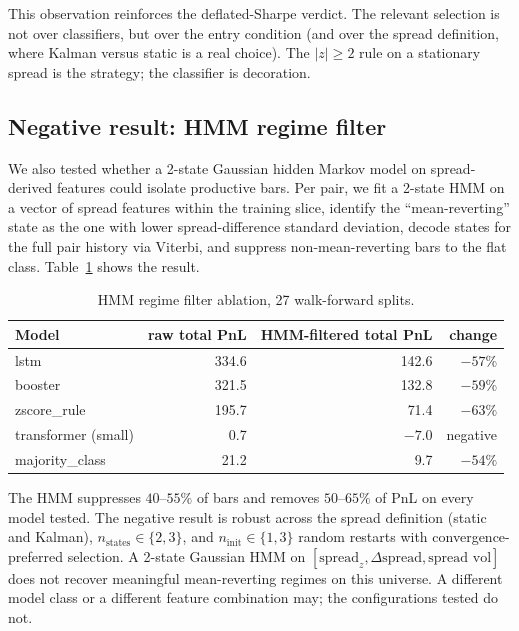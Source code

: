\documentclass[11pt]{article}
\begin{document}
This observation reinforces the deflated-Sharpe verdict. The relevant
selection is not over classifiers, but over the entry condition
(and over the spread definition, where Kalman versus static is a
real choice). The $|z| \geq 2$ rule on a stationary spread is the
strategy; the classifier is decoration.

\subsection{Negative result: HMM regime filter}

We also tested whether a 2-state Gaussian hidden Markov model on
spread-derived features could isolate productive bars. Per pair, we
fit a 2-state HMM on a vector of spread features within the training
slice, identify the ``mean-reverting'' state as the one with lower
spread-difference standard deviation, decode states for the full
pair history via Viterbi, and suppress non-mean-reverting bars to the
flat class. Table~\ref{tab:hmm} shows the result.

\begin{table}[h]
\centering
\caption{HMM regime filter ablation, 27 walk-forward splits.}
\label{tab:hmm}
\small
\begin{tabular}{lrrr}
\toprule
Model & raw total PnL & HMM-filtered total PnL & change \\
\midrule
lstm                          & 334.6 & 142.6 & $-57\%$ \\
booster                       & 321.5 & 132.8 & $-59\%$ \\
zscore\_rule                  & 195.7 &  71.4 & $-63\%$ \\
transformer (small)           &   0.7 &  $-7.0$ & negative \\
majority\_class               &  21.2 &   9.7 & $-54\%$ \\
\bottomrule
\end{tabular}
\end{table}

The HMM suppresses $40$--$55\%$ of bars and removes $50$--$65\%$ of
PnL on every model tested. The negative result is robust across the
spread definition (static and Kalman), $n_{\text{states}} \in \{2, 3\}$,
and $n_{\text{init}} \in \{1, 3\}$ random restarts with
convergence-preferred selection. A 2-state Gaussian HMM on
$[\text{spread}_z, \Delta\text{spread}, \text{spread vol}]$ does not
recover meaningful mean-reverting regimes on this universe. A
different model class or a different feature combination may; the
configurations tested do not.
\end{document}
